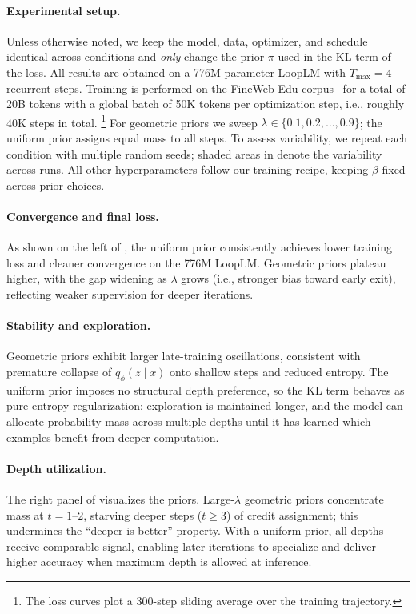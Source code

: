 \documentclass[]{bytedance_seed}
\newcommand{\1}{\mathbf{1}}
\newcommand{\ut}{LoopLM}
\begin{document}
\paragraph{Experimental setup.}
Unless otherwise noted, we keep the model, data, optimizer, and schedule identical across conditions and \emph{only} change the prior $\pi$ used in the KL term of the loss.
All results are obtained on a 776M-parameter \ut{} with $T_{\max}=4$ recurrent steps.
Training is performed on the FineWeb-Edu corpus~\cite{penedo2024fineweb} for a total of 20B tokens with a global batch of 50K tokens per optimization step, i.e., roughly 40K steps in total.%
\footnote{The loss curves plot a 300-step sliding average over the training trajectory.}
For geometric priors we sweep $\lambda\!\in\!\{0.1,0.2,\dots,0.9\}$; the uniform prior assigns equal mass to all steps.
To assess variability, we repeat each condition with multiple random seeds; shaded areas in  denote the variability across runs.
All other hyperparameters follow our training recipe, keeping $\beta$ fixed across prior choices.

\paragraph{Convergence and final loss.}
As shown on the left of , the uniform prior consistently achieves lower training loss and cleaner convergence on the 776M \ut{}.
Geometric priors plateau higher, with the gap widening as $\lambda$ grows (i.e., stronger bias toward early exit), reflecting weaker supervision for deeper iterations.

\paragraph{Stability and exploration.}
Geometric priors exhibit larger late-training oscillations, consistent with premature collapse of $q_\phi(z\!\mid\!x)$ onto shallow steps and reduced entropy.
The uniform prior imposes no structural depth preference, so the KL term behaves as pure entropy regularization: exploration is maintained longer, and the model can allocate probability mass across multiple depths until it has learned which examples benefit from deeper computation.

\paragraph{Depth utilization.}
The right panel of  visualizes the priors.
Large-$\lambda$ geometric priors concentrate mass at $t{=}1$--$2$, starving deeper steps ($t{\ge}3$) of credit assignment; this undermines the ``deeper is better'' property.
With a uniform prior, all depths receive comparable signal, enabling later iterations to specialize and deliver higher accuracy when maximum depth is allowed at inference.
\end{document}
